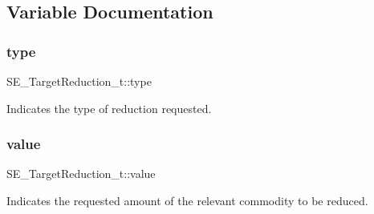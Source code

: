 \subsection{Variable Documentation}
\mbox{\label{group__TargetReduction_ga62a38286d35648e7858f31c933bdbefe}} 
\subsubsection{\texorpdfstring{type}{type}}
{\footnotesize\ttfamily S\+E\+\_\+\+Target\+Reduction\+\_\+t\+::type}

Indicates the type of reduction requested. \mbox{\label{group__TargetReduction_ga0e051bb112da6ceb397749dd75275896}} 
\subsubsection{\texorpdfstring{value}{value}}
{\footnotesize\ttfamily S\+E\+\_\+\+Target\+Reduction\+\_\+t\+::value}

Indicates the requested amount of the relevant commodity to be reduced. 